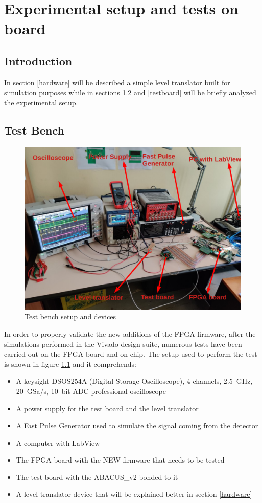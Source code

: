 \chapter{Experimental setup and tests on board}
\section{Introduction}
In section \ref{hardware} will be described a simple level translator built for simulation purposes while in sections \ref{testbench} and \ref{testboard} will be briefly analyzed the experimental setup.

\section{Test Bench}\label{testbench}
\begin{figure}[H]
	\centering
	\includegraphics[width=0.7\linewidth]{IMG/ch5/TESTBENCH}
	\caption{Test bench setup and devices}
	\label{fig:testbench}
\end{figure}
In order to properly validate the new additions of the FPGA firmware, after the simulations performed in the Vivado design suite, numerous tests have been carried out on the FPGA board and on chip.
The setup used to perform the test is shown in figure \ref{fig:testbench} and it comprehends:
\begin{itemize}
	\item A keysight DSOS254A (Digital Storage Oscilloscope), 4-channels, 2.5~GHz, 20~GSa/s, 10~bit ADC professional oscilloscope
	\item A power supply for the test board and the level translator
	\item A Fast Pulse Generator used to simulate the signal coming from the detector
	\item A computer with LabView
	\item The FPGA board with the NEW firmware that needs to be tested
	\item The test board with the ABACUS\_v2 bonded to it
	\item A level translator device that will be explained better in section \ref{hardware}
\end{itemize}

